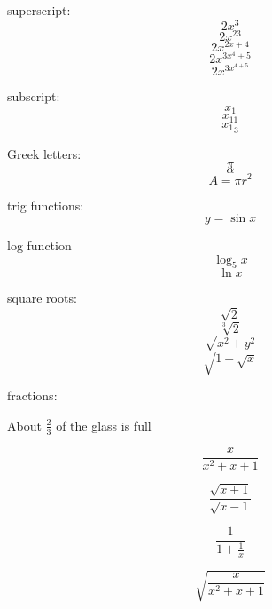 \documentclass[11pt]{article}
\begin{document}
superscript: 		%
$$2x^3$$
$$2x^{23}$$
$$2x^{2x+4}$$
$$2x^{3x^4+5}$$
$$2x^{3x^{4+5}}$$

subscript: 			
$$x_1$$
$$x_{11}$$
$${x_1}_3$$

Greek letters:
$$\pi$$
$$\alpha$$
$$A=\pi r^2$$

trig functions:
$$y=\sin{x}$$

log function
$$\log_5{x}$$
$$\ln{x}$$

square roots:
$$\sqrt{2}$$
$$\sqrt[3]{2}$$
$$\sqrt{x^2+y^2}$$
$$\sqrt{1+\sqrt{x}}$$

fractions:

About $\displaystyle{\frac{2}{3}}$ of the glass is full

$$\frac{x}{x^2+x+1}$$

$$\frac{\sqrt{x+1}}{\sqrt{x-1}}$$

$$\frac{1}{1+\frac{1}{x}}$$

$$\sqrt{\frac{x}{x^2+x+1}}$$
\end{document}
